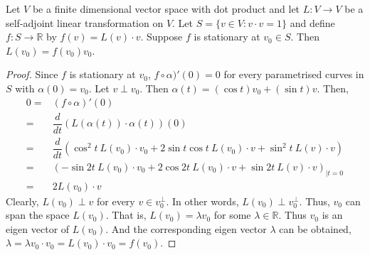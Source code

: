 \begin{lemma}
	Let $V$ be a finite dimensional vector space with dot product and let $L : V \to V$ be a self-adjoint linear transformation on $V$.
	Let $S = \{ v \in V : v\cdot v = 1\}$ and define $f : S \to \mathbb{R}$ by $f(v) = L(v) \cdot v$.
	Suppose $f$ is stationary at $v_0 \in S$.
	Then $L(v_0) = f(v_0)v_0$.
\end{lemma}
\begin{proof}
	Since $f$ is stationary at $v_0$, $f \circ \alpha)'(0) = 0$ for every parametrised curves in $S$ with $\alpha(0) = v_0$.
	Let $v \perp v_0$.
	Then $\alpha(t) = (\cos t)v_0 + (\sin t)v$.
	Then,
	\begin{align*}
		0 = & (f \circ \alpha)'(0)\\
		= & \dfrac{d}{dt} \left( L(\alpha(t)) \cdot \alpha(t)  \right)(0)\\
		= & \dfrac{d}{dt} \left( \cos^2 t\ L(v_0) \cdot v_0 + 2\sin t \cos t\ L(v_0) \cdot v + \sin^2 t\ L(v) \cdot v \right)\\
		= & \left(-\sin 2t\ L(v_0) \cdot v_0 + 2\cos 2t\ L(v_0) \cdot v + \sin 2t\ L(v) \cdot v\right)_{|t = 0} \\
		= & 2L(v_0) \cdot v
	\end{align*}
	Clearly, $L(v_0) \perp v$ for every $v \in v_0^\perp$.
	In other words, $L(v_0) \perp v_0^\perp$.
	Thus, $v_0$ can span the space $L(v_0)$.
	That is, $L(v_0) = \lambda v_0$ for some $\lambda \in \mathbb{R}$.
	Thus $v_0$ is an eigen vector of $L(v_0)$.
	And the corresponding eigen vector $\lambda$ can be obtained, $ \lambda = \lambda v_0 \cdot v_0 = L(v_0) \cdot v_0 = f(v_0)$.
\end{proof}


